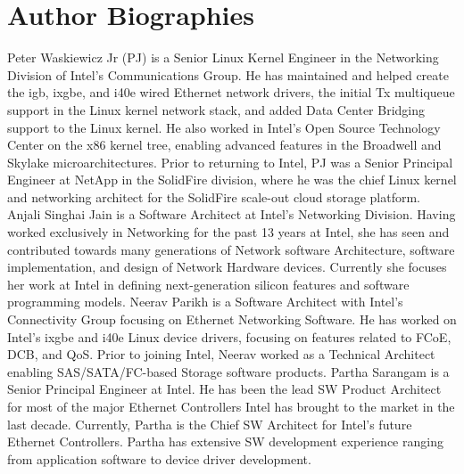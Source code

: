 \documentclass[letterpaper]{article}
\begin{document}
\section{Author Biographies}
Peter Waskiewicz Jr (PJ) is a Senior Linux Kernel Engineer in the Networking Division of Intel's Communications Group. He has maintained and helped create the igb, ixgbe, and i40e wired Ethernet network drivers, the initial Tx multiqueue support in the Linux kernel network stack, and added Data Center Bridging support to the Linux kernel. He also worked in Intel's Open Source Technology Center on the x86 kernel tree, enabling advanced features in the Broadwell and Skylake microarchitectures. Prior to returning to Intel, PJ was a Senior Principal Engineer at NetApp in the SolidFire division, where he was the chief Linux kernel and networking architect for the SolidFire scale-out cloud storage platform.
\newline
\newline
Anjali Singhai Jain is a Software Architect at Intel's Networking Division. Having worked exclusively in Networking for the past 13 years at Intel, she has seen and contributed towards many generations of Network software Architecture, software implementation, and design of Network Hardware devices. Currently she focuses her work at Intel in defining next-generation silicon features and software programming models.
\newline
\newline
Neerav Parikh is a Software Architect with Intel's Connectivity Group focusing on Ethernet Networking Software. He has worked on Intel's ixgbe and i40e Linux device drivers, focusing on features related to FCoE, DCB, and QoS. Prior to joining Intel, Neerav worked as a Technical Architect enabling SAS/SATA/FC-based Storage software products.
\newline
\newline
Partha Sarangam is a Senior Principal Engineer at Intel. He has been the lead SW Product Architect for most of the major Ethernet Controllers Intel has brought to the market in the last decade. Currently, Partha is the Chief SW Architect for Intel's future Ethernet Controllers. Partha has extensive SW development experience ranging from application software to device driver development.
\end{document}
